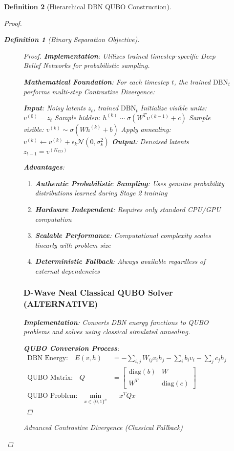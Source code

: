 \documentclass{article}
\newtheorem{definition}{Definition}
\begin{document}
\begin{definition}[Hierarchical DBN QUBO Construction]
\begin{proof}
\begin{definition}[Binary Separation Objective]
\begin{figure}[H]
\begin{proof}
\textbf{Implementation}: Utilizes trained timestep-specific Deep Belief Networks for probabilistic sampling.

\textbf{Mathematical Foundation}: For each timestep $t$, the trained $\text{DBN}_t$ performs multi-step Contrastive Divergence:

\begin{algorithm}
\caption{Advanced Contrastive Divergence (Classical Fallback)}
\begin{algorithmic}[1]
\STATE \textbf{Input}: Noisy latents $z_t$, trained $\text{DBN}_t$
\STATE Initialize visible units: $v^{(0)} = z_t$
    \STATE Sample hidden: $h^{(k)} \sim \sigma(W^T v^{(k-1)} + c)$
    \STATE Sample visible: $v^{(k)} \sim \sigma(W h^{(k)} + b)$
    \STATE Apply annealing: $v^{(k)} \leftarrow v^{(k)} + \epsilon_k \mathcal{N}(0, \sigma_k^2)$
\ENDFOR
\STATE \textbf{Output}: Denoised latents $z_{t-1} = v^{(K_{\text{CD}})}$
\end{algorithmic}
\end{algorithm}

\textbf{Advantages}:
\begin{enumerate}
\item \textbf{Authentic Probabilistic Sampling}: Uses genuine probability distributions learned during Stage 2 training
\item \textbf{Hardware Independent}: Requires only standard CPU/GPU computation
\item \textbf{Scalable Performance}: Computational complexity scales linearly with problem size
\item \textbf{Deterministic Fallback}: Always available regardless of external dependencies
\end{enumerate}

\subsubsection{D-Wave Neal Classical QUBO Solver (ALTERNATIVE)}

\textbf{Implementation}: Converts DBN energy functions to QUBO problems and solves using classical simulated annealing.

\textbf{QUBO Conversion Process}:
\begin{align}
\text{DBN Energy:} \quad E(v, h) &= -\sum_{i,j} W_{ij} v_i h_j - \sum_i b_i v_i - \sum_j c_j h_j\\
\text{QUBO Matrix:} \quad Q &= \begin{bmatrix} \text{diag}(b) & W \\ W^T & \text{diag}(c) \end{bmatrix}\\
\text{QUBO Problem:} \quad \min_{x \in \{0,1\}^n} & \quad x^T Q x
\end{align}


\end{proof}
\end{figure}
\end{definition}
\end{proof}
\end{definition}
\end{document}
